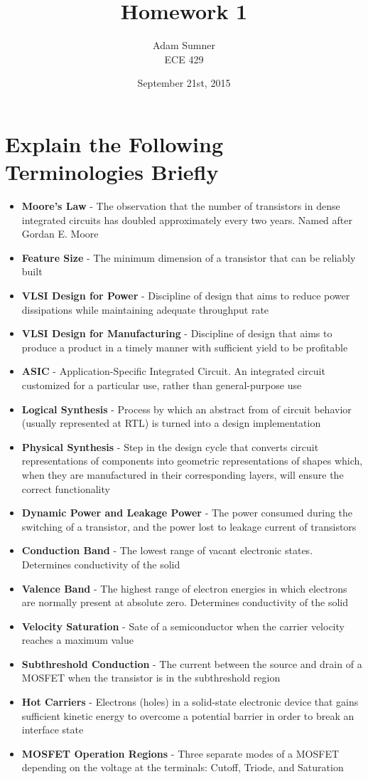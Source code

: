 \documentclass[11pt]{article}
\title{\textbf{Homework 1}}
\author{Adam Sumner \\ ECE 429}
\date{September 21st, 2015}
\begin{document}
\maketitle

\section{Explain the Following Terminologies Briefly}

\begin{itemize}
	\item \textbf{Moore's Law} - The observation that the number of transistors in dense integrated circuits has doubled approximately every two years. Named after Gordan E. Moore
	\item \textbf{Feature Size} - The minimum dimension of a transistor that can be reliably built
	\item \textbf{VLSI Design for Power} - Discipline of design that aims to reduce power dissipations while maintaining adequate throughput rate
	\item \textbf{VLSI Design for Manufacturing} - Discipline of design that aims to produce a product in a timely manner with sufficient yield to be profitable
	\item \textbf{ASIC} - Application-Specific Integrated Circuit. An integrated circuit customized for a particular use, rather than general-purpose use
	\item \textbf{Logical Synthesis} - Process by which an abstract from of circuit behavior (usually represented at RTL) is turned into a design implementation
	\item \textbf{Physical Synthesis} - Step in the design cycle that converts circuit representations of components into geometric representations of shapes which, when they are manufactured in their corresponding layers, will ensure the correct functionality
	\item \textbf{Dynamic Power and Leakage Power} - The power consumed during the switching of a transistor, and the power lost to leakage current of transistors
	\item \textbf{Conduction Band} - The lowest range of vacant electronic states. Determines conductivity of the solid
	\item \textbf{Valence Band} - The highest range of electron energies in which electrons are normally present at absolute zero. Determines conductivity of the solid
	\item \textbf{Velocity Saturation} - Sate of a semiconductor when the carrier velocity reaches a maximum value
	\item \textbf{Subthreshold Conduction} - The current between the source and drain of a MOSFET when the transistor is in the subthreshold region
	\item \textbf{Hot Carriers} - Electrons (holes) in a solid-state electronic device that gains sufficient kinetic energy to overcome a potential barrier in order to break an interface state
	\item \textbf{MOSFET Operation Regions} - Three separate modes of a MOSFET depending on the voltage at the terminals: Cutoff, Triode, and Saturation
\end{itemize}
\end{document}

